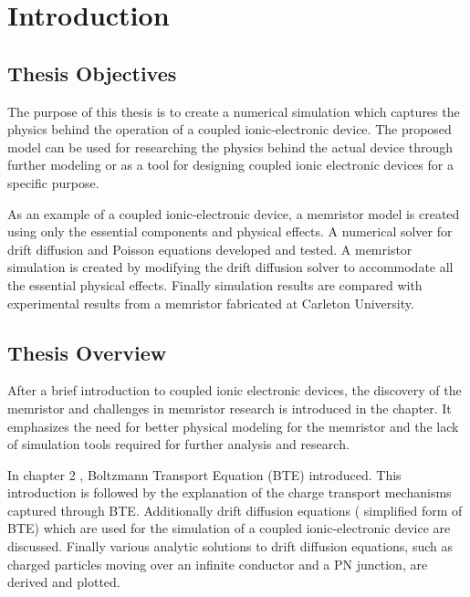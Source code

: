 
\chapter{Introduction} %


\label{Chapter1} %


\section{Thesis Objectives}
\begin{doublespace}
The purpose of this thesis is to create a numerical simulation which captures the physics behind the operation of a coupled ionic-electronic device. The proposed model can be used for researching the physics behind the actual device through further modeling or as a tool for designing coupled ionic electronic devices for a specific purpose. 

As an example of a coupled ionic-electronic device, a memristor model is created using only the essential components and physical effects. A numerical solver for  drift diffusion and Poisson equations  developed and tested. A memristor simulation is created by modifying the drift diffusion solver to accommodate all the essential physical effects. Finally simulation results are compared with experimental results from a memristor fabricated at Carleton University.

\section{Thesis Overview}

After a brief introduction to coupled ionic electronic devices, the discovery of the memristor and challenges in memristor research is introduced in the  chapter. It emphasizes the need for better physical modeling for the memristor and the lack of simulation tools required for further analysis and research.

In chapter 2 ,  Boltzmann Transport Equation (BTE)  introduced. This introduction is followed by the explanation of the charge transport mechanisms captured through  BTE. Additionally drift diffusion equations ( simplified form of BTE) which are used for the simulation of a coupled ionic-electronic device are discussed. Finally various analytic solutions to drift diffusion equations, such as charged particles moving over an infinite conductor and a PN junction, are derived and plotted. 


\end{doublespace}
